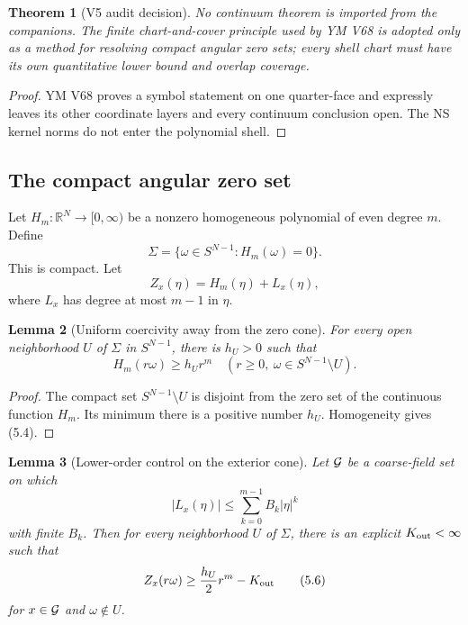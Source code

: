 \documentclass[11pt]{article}
\newtheorem{theorem}{Theorem}[section]
\newtheorem{lemma}[theorem]{Lemma}
\theoremstyle{remark}
\begin{document}
\begin{theorem}[V5 audit decision]
\label{thm:v17v5-audit}
No continuum theorem is imported from the companions.  The finite
chart-and-cover principle used by YM V68 is adopted only as a method
for resolving compact angular zero sets; every shell chart must have
its own quantitative lower bound and overlap coverage.
\end{theorem}

\begin{proof}
YM V68 proves a symbol statement on one quarter-face and expressly
leaves its other coordinate layers and every continuum conclusion
open.  The NS kernel norms do not enter the polynomial shell.
\end{proof}

\subsection{The compact angular zero set}

Let \(H_m:\mathbb R^N\to[0,\infty)\) be a nonzero homogeneous
polynomial of even degree \(m\).  Define
\[
 \Sigma=
 \{\omega\in S^{N-1}:H_m(\omega)=0\}.               \tag{5.2}
\]
This is compact.  Let
\[
 Z_x(\eta)=H_m(\eta)+L_x(\eta),                     \tag{5.3}
\]
where \(L_x\) has degree at most \(m-1\) in \(\eta\).

\begin{lemma}[Uniform coercivity away from the zero cone]
\label{lem:v17v5-away}
For every open neighborhood \(U\) of \(\Sigma\) in \(S^{N-1}\),
there is \(h_U>0\) such that
\[
 H_m(r\omega)\geq h_Ur^m
 \quad(r\geq0,\ \omega\in S^{N-1}\setminus U).      \tag{5.4}
\]
\end{lemma}

\begin{proof}
The compact set \(S^{N-1}\setminus U\) is disjoint from the zero set
of the continuous function \(H_m\).  Its minimum there is a positive
number \(h_U\).  Homogeneity gives (5.4).
\end{proof}

\begin{lemma}[Lower-order control on the exterior cone]
\label{lem:v17v5-exterior}
Let \({\cal G}\) be a coarse-field set on which
\[
 |L_x(\eta)|
 \leq\sum_{k=0}^{m-1}B_k|\eta|^k                  \tag{5.5}
\]
with finite \(B_k\).  Then for every neighborhood \(U\) of
\(\Sigma\), there is an explicit \(K_{\rm out}<\infty\) such that
\[
 Z_x(r\omega)\geq
 \frac{h_U}{2}r^m-K_{\rm out}                      \tag{5.6}
\]
for \(x\in{\cal G}\) and \(\omega\notin U\).
\end{lemma}
\end{document}
